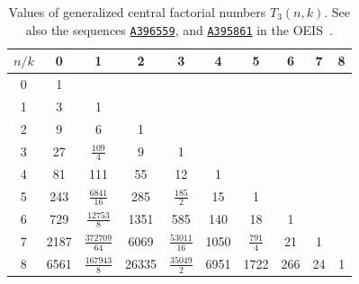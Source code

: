 \begin{table}[H]
  \begin{center}
    \setlength\extrarowheight{-6pt}
    \begin{tabular}{c|ccccccccc}
      $n/k$ & 0 & 1 & 2 & 3 & 4 & 5 & 6 & 7 & 8 \\ [3px]
      \hline
      0 & 1 &   &   &   &   &   &   &   &   \\
      1 & 3 & 1 &   &   &   &   &   &   &   \\
      2 & 9 & 6 & 1 &   &   &   &   &   &   \\
      3 & 27 & $\tfrac{109}{4}$ & 9 & 1 &   &   &   &   &   \\
      4 & 81 & 111 & 55 & 12 & 1 &   &   &   &   \\
      5 & 243 & $\tfrac{6841}{16}$ & 285 & $\tfrac{185}{2}$ & 15 & 1 &   &   &   \\
      6 & 729 & $\tfrac{12753}{8}$ & 1351 & 585 & 140 & 18 & 1 &   &   \\
      7 & 2187 & $\tfrac{372709}{64}$ & 6069 & $\tfrac{53011}{16}$ & 1050 & $\tfrac{791}{4}$ & 21 & 1 &   \\
      8 & 6561 & $\tfrac{167943}{8}$ & 26335 & $\tfrac{35049}{2}$ & 6951 & 1722 & 266 & 24 & 1 \\
    \end{tabular}
  \end{center}
  \caption{Values of generalized central factorial numbers $T_3(n,k)$.
    See also the sequences \href{https://oeis.org/A396559}{\texttt{A396559}},
    and \href{https://oeis.org/A395861}{\texttt{A395861}} in the OEIS~\cite{sloane2003line}.
  }
  \label{tab:central-factorial-numbers-t3}
\end{table}
